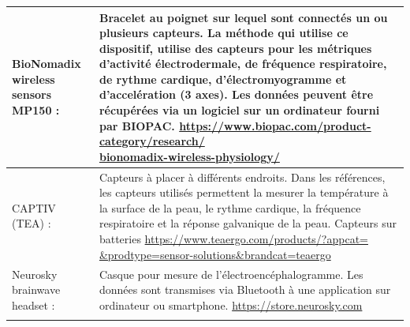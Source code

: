 \documentclass[11pt]{article}
\begin{document}
\begin{longtable}{|p{5cm}|p{10cm}|}
		BioNomadix wireless sensors MP150 :& Bracelet au poignet sur lequel sont connectés un ou plusieurs capteurs.
		La méthode qui utilise ce dispositif, utilise des capteurs pour les métriques d'activité électrodermale, de fréquence respiratoire, de rythme cardique, d'électromyogramme et d'accelération (3 axes). 
		Les données peuvent être récupérées via un logiciel sur un ordinateur fourni par BIOPAC.
		\newline \href{https://www.biopac.com/product-category/research/bionomadix-wireless-physiology/}{https://www.biopac.com/product-category/research/\newline bionomadix-wireless-physiology/}\\\hline
		CAPTIV (TEA) :& Capteurs à placer à différents endroits.
		Dans les références, les capteurs utilisés permettent la mesurer la température à la surface de la peau, le rythme cardique, la fréquence respiratoire et la réponse galvanique de la peau.
		Capteurs sur batteries
		\newline \href{https://www.teaergo.com/products/?appcat=&prodtype=sensor-solutions&brandcat=teaergo}{https://www.teaergo.com/products/?appcat=\newline \&prodtype=sensor-solutions\&brandcat=teaergo}\\\hline
        Neurosky brainwave headset :& Casque pour mesure de l'électroencéphalogramme.
        Les données sont transmises via Bluetooth à une application sur ordinateur ou smartphone.
        \newline \href{https://store.neurosky.com}{https://store.neurosky.com}\\
		\hline
		\label{tab:capteurs}
	\end{longtable}
\end{document}
